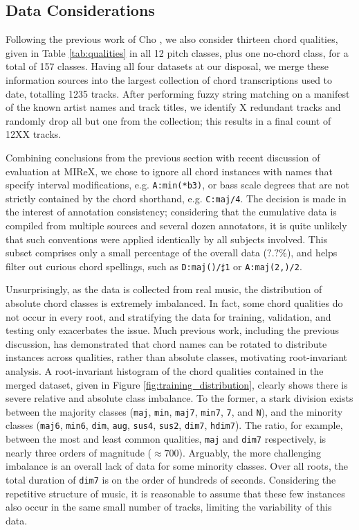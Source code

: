 \subsection{Data Considerations}
\label{subsec:data_considerations}
Following the previous work of Cho \cite{Cho2014}, we also consider thirteen chord qualities, given in Table \ref{tab:qualities} in all 12 pitch classes, plus one no-chord class, for a total of 157 classes.
Having all four datasets at our disposal, we merge these information sources into the largest collection of chord transcriptions used to date, totalling 1235 tracks.
After performing fuzzy string matching on a manifest of the known artist names and track titles, we identify X redundant tracks and randomly drop all but one from the collection; this results in a final count of 12XX tracks.

Combining conclusions from the previous section with recent discussion of evaluation at MIReX, we chose to ignore all chord instances with names that specify interval modifications, e.g. \texttt{A:min(*b3)}, or bass scale degrees that are not strictly contained by the chord shorthand, e.g. \texttt{C:maj/4}.
The decision is made in the interest of annotation consistency; considering that the cumulative data is compiled from multiple sources and several dozen annotators, it is quite unlikely that such conventions were applied identically by all subjects involved.
This subset comprises only a small percentage of the overall data ($?.?\%$), and helps filter out curious chord spellings, such as \texttt{D:maj()/$\sharp$1} or \texttt{A:maj(2,)/2}.

Unsurprisingly, as the data is collected from real music, the distribution of absolute chord classes is extremely imbalanced.
In fact, some chord qualities do not occur in every root, and stratifying the data for training, validation, and testing only exacerbates the issue.
Much previous work, including the previous discussion, has demonstrated that chord names can be rotated to distribute instances across qualities, rather than absolute classes, motivating root-invariant analysis.
A root-invariant histogram of the chord qualities contained in the merged dataset, given in Figure \ref{fig:training_distribution}, clearly shows there is severe relative and absolute class imbalance.
To the former, a stark division exists between the majority classes (\texttt{maj}, \texttt{min}, \texttt{maj7}, \texttt{min7}, \texttt{7}, and \texttt{N}), and the minority classes (\texttt{maj6}, \texttt{min6}, \texttt{dim}, \texttt{aug}, \texttt{sus4}, \texttt{sus2}, \texttt{dim7}, \texttt{hdim7}).
The ratio, for example, between the most and least common qualities, \texttt{maj} and \texttt{dim7} respectively, is nearly three orders of magnitude ($\approx 700$).
Arguably, the more challenging imbalance is an overall lack of data for some minority classes.
Over all roots, the total duration of \texttt{dim7} is on the order of hundreds of seconds.
Considering the repetitive structure of music, it is reasonable to assume that these few instances also occur in the same small number of tracks, limiting the variability of this data.


